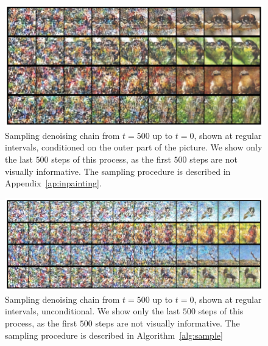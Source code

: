 \documentclass[nohyperref]{article}
\theoremstyle{plain}
\theoremstyle{definition}
\theoremstyle{remark}
\begin{document}
\begin{figure}
    \centering
    \includegraphics[width=1\linewidth]{images/ours/chains2.png}
    \caption{Sampling denoising chain from $t=500$ up to $t=0$, shown at regular intervals, conditioned on the outer part of the picture. We show only the last $500$ steps of this process, as the first $500$ steps are not visually informative. The sampling procedure is described in Appendix~\ref{ap:inpainting}.}
    \label{fig:miniimagenet_prior_ours_chain}
\end{figure}


\begin{figure}
    \centering
    \includegraphics[width=1\linewidth]{images/ours/chains_unconditional.png}
    \caption{Sampling denoising chain from $t=500$ up to $t=0$, shown at regular intervals, unconditional. We show only the last $500$ steps of this process, as the first $500$ steps are not visually informative. The sampling procedure is described in Algorithm~\ref{alg:sample}}
    \label{fig:miniimagenet_prior_ours_chain_unconditional}
\end{figure}
\end{document}
